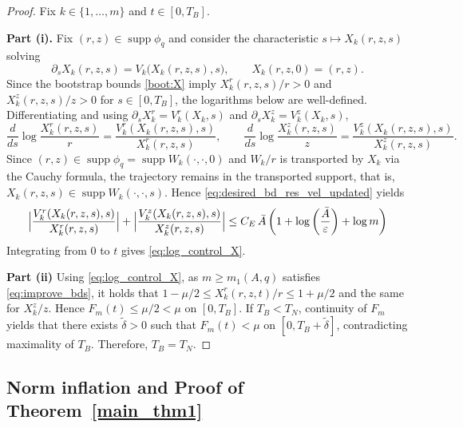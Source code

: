 \documentclass[reqno,11pt]{amsart}
\newcommand{\supp}{\operatorname{supp}}
\begin{document}
\begin{proof}
Fix $k\in\{1,\dots,m\}$ and $t\in[0,T_B]$.

\medskip
\noindent \textbf{Part (i).} Fix $(r,z)\in\supp\phi_q$ and consider the characteristic $s\mapsto X_k(r,z,s)$ solving
\[
\partial_s X_k(r,z,s)=V_k\bigl(X_k(r,z,s),s\bigr),\qquad X_k(r,z,0)=(r,z).
\]
Since the bootstrap bounds \eqref{boot:X} imply $X_k^r(r,z,s)/r>0$ and $X_k^z(r,z,s)/z>0$ for $s\in[0,T_B]$, the logarithms below are well-defined. Differentiating and using $\partial_s X_k^r=V_k^r(X_k,s)$ and $\partial_s X_k^z=V_k^z(X_k,s)$,
\[
\frac{d}{ds}\log\frac{X_k^r(r,z,s)}{r}
=\frac{V_k^r(X_k(r,z,s),s)}{X_k^r(r,z,s)},
\qquad
\frac{d}{ds}\log\frac{X_k^z(r,z,s)}{z}
=\frac{V_k^z(X_k(r,z,s),s)}{X_k^z(r,z,s)}.
\]
Since $(r,z)\in \supp \phi_q =\supp W_k(\cdot,\cdot,0)$ and $W_k/r$ is transported by $X_k$ via the Cauchy formula, the trajectory remains in the transported support, that is,  $X_k(r,z,s)\in\supp W_k(\cdot,\cdot,s)$. Hence \eqref{eq:desired_bd_res_vel_updated}  yields
\[
\Bigl|\frac{V_k^r(X_k(r,z,s),s)}{X_k^r(r,z,s)}\Bigr|
+\Bigl|\frac{V_k^z(X_k(r,z,s),s)}{X_k^z(r,z,s)}\Bigr|
\le C_E\,\bar A \left( 1 + \log\left(\frac{\bar A}{\varepsilon}\right) + \log m \right)
\]
Integrating from $0$ to $t$ gives \eqref{eq:log_control_X}.

\medskip
\noindent \textbf{Part (ii)}
Using \eqref{eq:log_control_X}, as $m\geq m_1(A,q)$ satisfies \eqref{eq:improve_bds}, it holds that 
$1-\mu/2\le X_k^r(r,z,t)/r\le 1+\mu/2$ and the same for $X_k^z/z$.
Hence $F_m(t) \leq \mu/2<\mu$ on $[0,T_B].$ If $T_B<T_N$, continuity of $F_m$ yields that there exists $\tilde{\delta}>0$ such that $F_m(t) < \mu$ on $[0,T_B+\tilde{\delta}]$, contradicting maximality of $T_B$. Therefore, $T_B=T_N$.
\end{proof}







\subsection{Norm inflation and Proof of Theorem~\ref{main_thm1}}
\label{sec:proof_Thm1}
\end{document}
